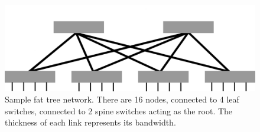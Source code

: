 \begin{figure}[h]
	\centering
	\includegraphics[width = 4.5in]{3_Chapters/2_Chapter_Background/Figs/FatTree.png}
	\caption[Sample fat tree network]{
     Sample fat tree network.
     There are 16 nodes, connected to 4 leaf switches, connected to 2 spine switches acting as the root.
     The thickness of each link represents its bandwidth.
     }
	\label{fig:fat-tree-topology}
\end{figure}
